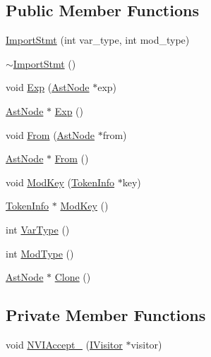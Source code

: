 \subsection*{Public Member Functions}
\begin{DoxyCompactItemize}
\item 
\hyperlink{classmocha_1_1_import_stmt_a3f928c4c6a92ef9ea177db02d178432a}{ImportStmt} (int var\_\-type, int mod\_\-type)
\item 
\hyperlink{classmocha_1_1_import_stmt_a8c7698fed291a05e8e14f7c1a486baf8}{$\sim$ImportStmt} ()
\item 
void \hyperlink{classmocha_1_1_import_stmt_a16dbea08013d938e95c493e63bee9892}{Exp} (\hyperlink{classmocha_1_1_ast_node}{AstNode} $\ast$exp)
\item 
\hyperlink{classmocha_1_1_ast_node}{AstNode} $\ast$ \hyperlink{classmocha_1_1_import_stmt_a6efc53a255f8d4aa69bca40b4a977692}{Exp} ()
\item 
void \hyperlink{classmocha_1_1_import_stmt_a5c2f908ba9f8d7252f70c7dab6fac49a}{From} (\hyperlink{classmocha_1_1_ast_node}{AstNode} $\ast$from)
\item 
\hyperlink{classmocha_1_1_ast_node}{AstNode} $\ast$ \hyperlink{classmocha_1_1_import_stmt_a36ccde1083500d60e19c3ca873cfc39f}{From} ()
\item 
void \hyperlink{classmocha_1_1_import_stmt_aa63d98aac6f3d5bb5f52fbce853dde2e}{ModKey} (\hyperlink{classmocha_1_1_token_info}{TokenInfo} $\ast$key)
\item 
\hyperlink{classmocha_1_1_token_info}{TokenInfo} $\ast$ \hyperlink{classmocha_1_1_import_stmt_a9ff08224aa88107727c1194a4f71b2ae}{ModKey} ()
\item 
int \hyperlink{classmocha_1_1_import_stmt_a962ffe61aa8d85ecc0919003ac237cac}{VarType} ()
\item 
int \hyperlink{classmocha_1_1_import_stmt_a98a7ddefa13cbca1e1c6886231b83c8b}{ModType} ()
\item 
\hyperlink{classmocha_1_1_ast_node}{AstNode} $\ast$ \hyperlink{classmocha_1_1_import_stmt_a8050753f0fd1beeb3778c372ded6ca99}{Clone} ()
\end{DoxyCompactItemize}
\subsection*{Private Member Functions}
\begin{DoxyCompactItemize}
\item 
void \hyperlink{classmocha_1_1_import_stmt_a75f5f5ca0a60825d11a0f0f8c182b48f}{NVIAccept\_\-} (\hyperlink{classmocha_1_1_i_visitor}{IVisitor} $\ast$visitor)
\end{DoxyCompactItemize}
